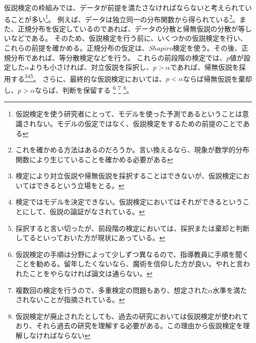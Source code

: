 仮説検定の枠組みでは、データが前提を満たさなければならないと考えられていることが多い\footnote{仮説検定を使う研究者にとって、モデルを使った予測であるということは意識されない。モデルの仮定ではなく、仮説検定をするための前提のことである}。
例えば、データは独立同一の分布関数から得られている\footnote{これを確かめる方法はあるのだろうか。言い換えるなら、現象が数学的分布関数により生じていることを確かめる必要がある}。また、正規分布を仮定しているのであれば、データの分散と帰無仮説の分散が等しいなどである。
そのため、仮説検定を行う前に、いくつかの仮説検定を行い、これらの前提を確かめる。正規分布の仮定は、$Shapiro$検定を使う。その後、正規分布であれば、等分散検定などを行う。
これらの前段階の検定では、$p$値が設定した$\alpha$よりも小さければ、対立仮説を採択し、$p>\alpha$であれば、帰無仮説を採用する\footnote{検定により対立仮説や帰無仮説を採択することはできないが、仮説検定においてはできるという立場をとる。}\footnote{検定ではモデルを決定できない。仮説検定においてはそれができるということにして、仮説の論証がなされている。}\footnote{採択すると言い切ったが、前段階の検定においては、採択または棄却と判断してるといっておいた方が現状にあっている。}。
さらに、最終的な仮説検定においては、$p<\alpha$ならば帰無仮説を棄却し、$p>\alpha$ならば、判断を保留する
\footnote{仮説検定の手順は分野によって少しずつ異なるので、指導教員に手順を聞くことを勧める。留年したくないなら、魔術を信仰した方が良い。やれと言われたことをやらなければ論文は通らない。}
\footnote{複数回の検定を行うので、多重検定の問題もあり、想定された$\alpha$水準を満たされないことが指摘されている。}
\footnote{仮説検定が廃止されたとしても、過去の研究においては仮説検定が使われており、それら過去の研究を理解する必要がある。この理由から仮説検定を理解しなければならない}。




